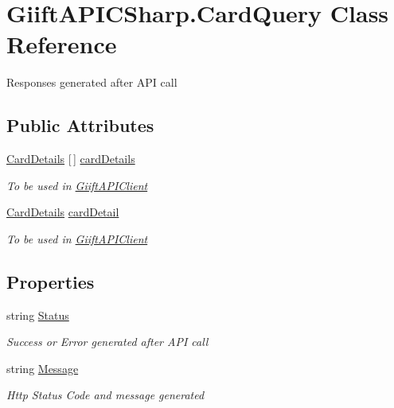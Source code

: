 \hypertarget{class_giift_a_p_i_c_sharp_1_1_card_query}{}\section{Giift\+A\+P\+I\+C\+Sharp.\+Card\+Query Class Reference}
\label{class_giift_a_p_i_c_sharp_1_1_card_query}


Responses generated after A\+PI call  


\subsection*{Public Attributes}
\begin{DoxyCompactItemize}
\item 
\hyperlink{class_giift_a_p_i_c_sharp_1_1_card_details}{Card\+Details} \mbox{[}$\,$\mbox{]} \hyperlink{class_giift_a_p_i_c_sharp_1_1_card_query_abf95fbe5a9f55425cbcec565bfff59ed}{card\+Details}
\begin{DoxyCompactList}\small\item\em To be used in \hyperlink{class_giift_a_p_i_c_sharp_1_1_giift_a_p_i_client}{Giift\+A\+P\+I\+Client} \end{DoxyCompactList}\item 
\hyperlink{class_giift_a_p_i_c_sharp_1_1_card_details}{Card\+Details} \hyperlink{class_giift_a_p_i_c_sharp_1_1_card_query_ab7d73191cdb237861104070264541d99}{card\+Detail}
\begin{DoxyCompactList}\small\item\em To be used in \hyperlink{class_giift_a_p_i_c_sharp_1_1_giift_a_p_i_client}{Giift\+A\+P\+I\+Client} \end{DoxyCompactList}\end{DoxyCompactItemize}
\subsection*{Properties}
\begin{DoxyCompactItemize}
\item 
string \hyperlink{class_giift_a_p_i_c_sharp_1_1_card_query_af75ace779849f5298e4343f6bb50f589}{Status}
\begin{DoxyCompactList}\small\item\em Success or Error generated after A\+PI call \end{DoxyCompactList}\item 
string \hyperlink{class_giift_a_p_i_c_sharp_1_1_card_query_a94152f3f72bc22b7308531877b7ff0df}{Message}
\begin{DoxyCompactList}\small\item\em Http Status Code and message generated \end{DoxyCompactList}\end{DoxyCompactItemize}


